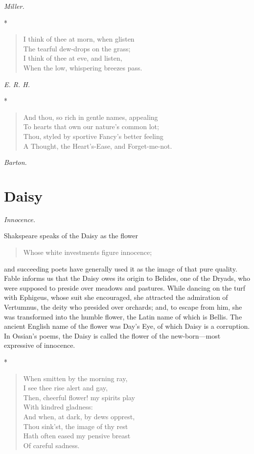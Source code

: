 \documentclass[11pt,twoside]{article}
\newcommand\flower[2]{\section*{#1}\addcontentsline{toc}{section}{#1}%
  \noindent\textit{#2.}\par\medskip}
\newcommand\stars{\begin{center}*\quad*\quad*\end{center}}
\newcommand\by[1]{\par\hfill\textit{#1}\par}
\begin{document}
\by{Miller.}

\stars

\begin{verse}
I think of thee at morn, when glisten\\
\quad The tearful dew-drops on the grass;\\
I think of thee at eve, and listen,\\
\quad When the low, whispering breezes pass.
\end{verse}

\by{E. R. H.}

\stars

\begin{verse}
And thou, so rich in gentle names, appealing\\
\quad To hearts that own our nature’s common lot;\\
Thou, styled by sportive Fancy’s better feeling\\
\quad A Thought, the Heart’s-Ease, and Forget-me-not.
\end{verse}

\by{Barton.}

\flower{Daisy}{Innocence}

Shakspeare speaks of the Daisy as the flower

\begin{verse}
Whose white investments figure innocence;
\end{verse}

and succeeding poets have generally used it as the image of that pure quality. Fable informs us that the Daisy owes its origin to Belides, one of the Dryads, who were supposed to preside over meadows and pastures. While dancing on the turf with Ephigeus, whose suit she encouraged, she attracted the admiration of Vertumnus, the deity who presided over orchards; and, to escape from him, she was transformed into the humble flower, the Latin name of which is Bellis. The ancient English name of the flower was Day’s Eye, of which Daisy is a corruption. In Ossian’s poems, the Daisy is called the flower of the new-born---most expressive of innocence.

\stars

\begin{verse}
When smitten by the morning ray,\\
I see thee rise alert and gay,\\
Then, cheerful flower! my spirits play\\
\quad With kindred gladness:\\
And when, at dark, by dews opprest,\\
Thou sink’st, the image of thy rest\\
Hath often eased my pensive breast\\
\quad Of careful sadness.
\end{verse}
\end{document}
